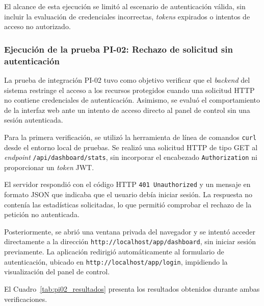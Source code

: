 El alcance de esta ejecución se limitó al escenario de autenticación válida, sin incluir la evaluación de credenciales incorrectas, \textit{tokens} expirados o intentos de acceso no autorizado.



\subsubsection{Ejecución de la prueba PI-02: Rechazo de solicitud sin autenticación}

La prueba de integración PI-02 tuvo como objetivo verificar que el \textit{backend} del sistema restringe el acceso a los recursos protegidos cuando una solicitud HTTP no contiene credenciales de autenticación. Asimismo, se evaluó el comportamiento de la interfaz web ante un intento de acceso directo al panel de control sin una sesión autenticada.

Para la primera verificación, se utilizó la herramienta de línea de comandos \texttt{curl} desde el entorno local de pruebas. Se realizó una solicitud HTTP de tipo GET al \textit{endpoint} \texttt{/api/dashboard/stats}, sin incorporar el encabezado \texttt{Authorization} ni proporcionar un \textit{token} JWT.

El servidor respondió con el código HTTP \texttt{401 Unauthorized} y un mensaje en formato JSON que indicaba que el usuario debía iniciar sesión. La respuesta no contenía las estadísticas solicitadas, lo que permitió comprobar el rechazo de la petición no autenticada.

Posteriormente, se abrió una ventana privada del navegador y se intentó acceder directamente a la dirección \texttt{http://localhost/app/dashboard}, sin iniciar sesión previamente. La aplicación redirigió automáticamente al formulario de autenticación, ubicado en \texttt{http://localhost/app/login}, impidiendo la visualización del panel de control.

El Cuadro~\ref{tab:pi02_resultados} presenta los resultados obtenidos durante ambas verificaciones.


